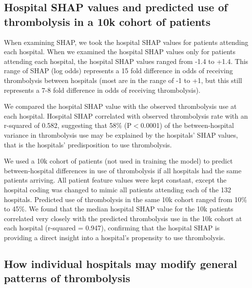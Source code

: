 
\subsection{Hospital SHAP values and predicted use of thrombolysis in a 10k cohort of patients}

When examining SHAP, we took the hospital SHAP values for patients attending each hospital. When we examined the hospital SHAP values only for patients attending each hospital, the hospital SHAP values ranged from -1.4 to +1.4. This range of SHAP (log odds) represents a 15 fold difference in odds of receiving thrombolysis between hospitals (most are in the range of -1 to +1, but this still represents a 7-8 fold difference in odds of receiving thrombolysis).

We compared the hospital SHAP value with the observed thrombolysis use at each hospital. Hospital SHAP correlated with observed thrombolysis rate with an r-squared of 0.582, suggesting that 58\% (P$<$0.0001) of the between-hospital variance in thrombolysis use may be explained by the hospitals' SHAP values, that is the hospitals' predisposition to use thrombolysis.

We used a 10k cohort of patients (not used in training the model) to predict between-hospital differences in use of thrombolysis if all hospitals had the same patients arriving. All patient feature values were kept constant, except the hospital coding was changed to mimic all patients attending each of the 132 hospitals. Predicted use of thrombolysis in the same 10k cohort ranged from 10\% to 45\%. We found that the median hospital SHAP value for the 10k patients correlated very closely with the predicted thrombolysis use in the 10k cohort at each hospital (r-squared = 0.947), confirming that the hospital SHAP is providing a direct insight into a hospital's propensity to use thrombolysis.



\subsection{How individual hospitals may modify general patterns of thrombolysis}

